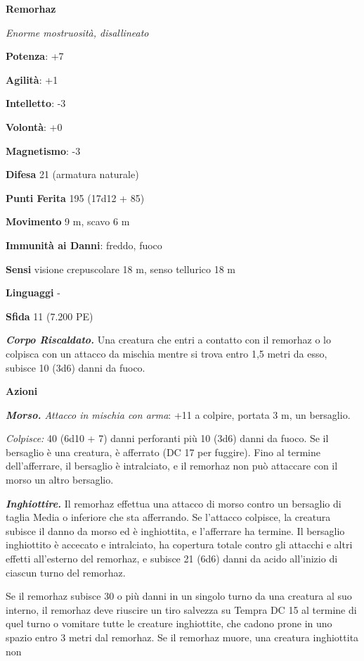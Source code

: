 \begin{multicols}{2}
\textbf{Remorhaz}

\emph{Enorme mostruosità, disallineato}

\textbf{Potenza}: +7

\textbf{Agilità}: +1

\textbf{Intelletto}: -3

\textbf{Volontà}: +0

\textbf{Magnetismo}: -3

\textbf{Difesa} 21 (armatura naturale)

\textbf{Punti Ferita} 195 (17d12 + 85)

\textbf{Movimento} 9 m, scavo 6 m

\textbf{Immunità ai Danni}: freddo, fuoco

\textbf{Sensi} visione crepuscolare 18 m, senso tellurico 18 m

\textbf{Linguaggi} -

\textbf{Sfida} 11 (7.200 PE)\smallskip

\emph{\textbf{Corpo Riscaldato.}} Una creatura che entri a contatto con
il remorhaz o lo colpisca con un attacco da mischia mentre si trova
entro 1,5 metri da esso, subisce 10 (3d6) danni da fuoco.

\smallskip\textbf{Azioni}

\emph{\textbf{Morso.} Attacco in mischia con arma}: +11 a colpire,
portata 3 m, un bersaglio.

\emph{Colpisce:} 40 (6d10 + 7) danni perforanti più 10 (3d6) danni da
fuoco. Se il bersaglio è una creatura, è afferrato (DC 17 per fuggire).
Fino al termine dell'afferrare, il bersaglio è intralciato, e il
remorhaz non può attaccare con il morso un altro bersaglio.

\emph{\textbf{Inghiottire.}} Il remorhaz effettua una attacco di morso
contro un bersaglio di taglia Media o inferiore che sta afferrando. Se
l'attacco colpisce, la creatura subisce il danno da morso ed è
inghiottita, e l'afferrare ha termine. Il bersaglio inghiottito è
accecato e intralciato, ha copertura totale contro gli attacchi e altri
effetti all'esterno del remorhaz, e subisce 21 (6d6) danni da acido
all'inizio di ciascun turno del remorhaz.

Se il remorhaz subisce 30 o più danni in un singolo turno da una
creatura al suo interno, il remorhaz deve riuscire un tiro salvezza su Tempra DC 15 al termine di quel turno o vomitare tutte le creature
inghiottite, che cadono prone in uno spazio entro 3 metri dal remorhaz.
Se il remorhaz muore, una creatura inghiottita non



\end{multicols}
